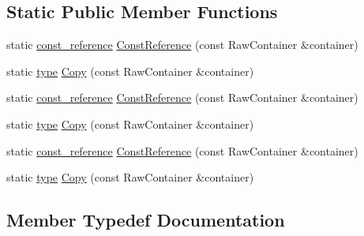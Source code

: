 \subsection*{Static Public Member Functions}
\begin{DoxyCompactItemize}
\item 
static \mbox{\hyperlink{classtesting_1_1internal_1_1_stl_container_view_a9cd4f6ed689b3938cdb7b3c4cbf1b36b}{const\+\_\+reference}} \mbox{\hyperlink{classtesting_1_1internal_1_1_stl_container_view_a36eccf53329730f6e55c12002128bf25}{Const\+Reference}} (const Raw\+Container \&container)
\item 
static \mbox{\hyperlink{classtesting_1_1internal_1_1_stl_container_view_a2b2c63a6dcdbfe63fb0ee121ebf463ba}{type}} \mbox{\hyperlink{classtesting_1_1internal_1_1_stl_container_view_a441123838221f1284873f66ed968f279}{Copy}} (const Raw\+Container \&container)
\item 
static \mbox{\hyperlink{classtesting_1_1internal_1_1_stl_container_view_a9cd4f6ed689b3938cdb7b3c4cbf1b36b}{const\+\_\+reference}} \mbox{\hyperlink{classtesting_1_1internal_1_1_stl_container_view_a36eccf53329730f6e55c12002128bf25}{Const\+Reference}} (const Raw\+Container \&container)
\item 
static \mbox{\hyperlink{classtesting_1_1internal_1_1_stl_container_view_a2b2c63a6dcdbfe63fb0ee121ebf463ba}{type}} \mbox{\hyperlink{classtesting_1_1internal_1_1_stl_container_view_a441123838221f1284873f66ed968f279}{Copy}} (const Raw\+Container \&container)
\item 
static \mbox{\hyperlink{classtesting_1_1internal_1_1_stl_container_view_a9cd4f6ed689b3938cdb7b3c4cbf1b36b}{const\+\_\+reference}} \mbox{\hyperlink{classtesting_1_1internal_1_1_stl_container_view_a36eccf53329730f6e55c12002128bf25}{Const\+Reference}} (const Raw\+Container \&container)
\item 
static \mbox{\hyperlink{classtesting_1_1internal_1_1_stl_container_view_a2b2c63a6dcdbfe63fb0ee121ebf463ba}{type}} \mbox{\hyperlink{classtesting_1_1internal_1_1_stl_container_view_a441123838221f1284873f66ed968f279}{Copy}} (const Raw\+Container \&container)
\end{DoxyCompactItemize}


\subsection{Member Typedef Documentation}
\mbox{\label{classtesting_1_1internal_1_1_stl_container_view_a9cd4f6ed689b3938cdb7b3c4cbf1b36b}} 
